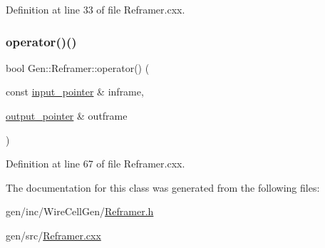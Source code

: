 Definition at line 33 of file Reframer.\+cxx.

\mbox{\label{class_wire_cell_1_1_gen_1_1_reframer_a134c00c1b1e270f74a90729a5b3219d5}} 
\subsubsection{\texorpdfstring{operator()()}{operator()()}}
{\footnotesize\ttfamily bool Gen\+::\+Reframer\+::operator() (\begin{DoxyParamCaption}\item[{const \hyperlink{class_wire_cell_1_1_i_function_node_a55c0946156df9b712b8ad1a0b59b2db6}{input\+\_\+pointer} \&}]{inframe,  }\item[{\hyperlink{class_wire_cell_1_1_i_function_node_afc02f1ec60d31aacddf64963f9ca650b}{output\+\_\+pointer} \&}]{outframe }\end{DoxyParamCaption})\hspace{0.3cm}{\ttfamily [virtual]}}



Definition at line 67 of file Reframer.\+cxx.



The documentation for this class was generated from the following files\+:\begin{DoxyCompactItemize}
\item 
gen/inc/\+Wire\+Cell\+Gen/\hyperlink{_reframer_8h}{Reframer.\+h}\item 
gen/src/\hyperlink{_reframer_8cxx}{Reframer.\+cxx}\end{DoxyCompactItemize}
